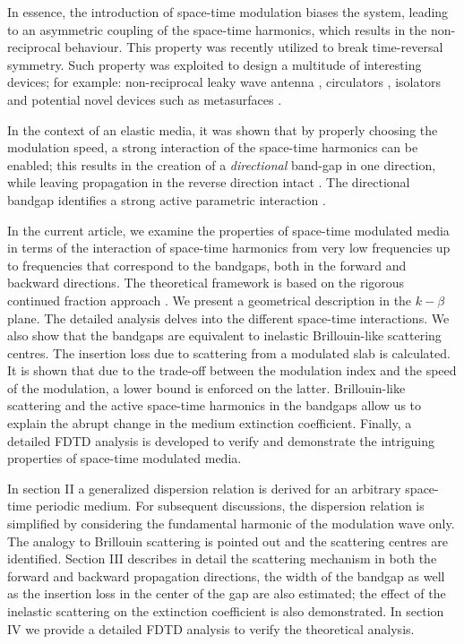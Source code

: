 \documentclass[journal]{IEEEtran}
\begin{document}
In essence, the introduction of space-time modulation biases the system, leading to an asymmetric coupling of the space-time harmonics, which results in the non-reciprocal behaviour. This property was recently utilized to break time-reversal symmetry. Such property was exploited to design a multitude of interesting devices; for example: non-reciprocal leaky wave antenna \cite{Hadad2016, Taravati2017mixer}, circulators \cite{Qin2014, Alu2016magnetless}, isolators \cite{Taravati2017oblique} and potential novel devices such as metasurfaces \cite{Caloz2016_STmetasurfaces}.

In the context of an elastic media, it was shown that by properly choosing the modulation speed, a strong interaction of the space-time harmonics can be enabled; this results in the creation of a \emph{directional} band-gap in one direction, while leaving propagation in the reverse direction intact \cite{Trainiti2016}. The directional bandgap identifies a strong active parametric interaction \cite{Oliner1961, Cassedy1963}.

In the current article, we examine the properties of space-time modulated media in terms of the interaction of space-time harmonics from very low frequencies up to frequencies that correspond to the bandgaps, both in the forward and backward directions. The theoretical framework is based on the rigorous continued fraction approach \cite{Oliner1961, Cassedy1963, Cassedy1967}. We present a geometrical description in the $k-\beta$ plane. The detailed analysis delves into the different space-time interactions. We also show that the bandgaps are equivalent to inelastic Brillouin-like scattering centres. The insertion loss due to scattering from a modulated slab is calculated. It is shown that due to the trade-off between the modulation index and the speed of the modulation, a lower bound is enforced on the latter. Brillouin-like scattering and the active space-time harmonics in the bandgaps allow us to explain the abrupt change in the medium extinction coefficient. Finally, a detailed FDTD analysis is developed to verify and demonstrate the intriguing properties of space-time modulated media.

In section II a generalized dispersion relation is derived for an arbitrary space-time periodic medium. For subsequent discussions, the dispersion relation is simplified by considering the fundamental harmonic of the modulation wave only. The analogy to Brillouin scattering is pointed out and the scattering centres are identified. Section III describes in detail the scattering mechanism in both the forward and backward propagation directions, the width of the bandgap as well as the insertion loss in the center of the gap are also estimated; the effect of the inelastic scattering on the extinction coefficient is also demonstrated. In section IV we provide a detailed FDTD analysis to verify the theoretical analysis.
\end{document}

